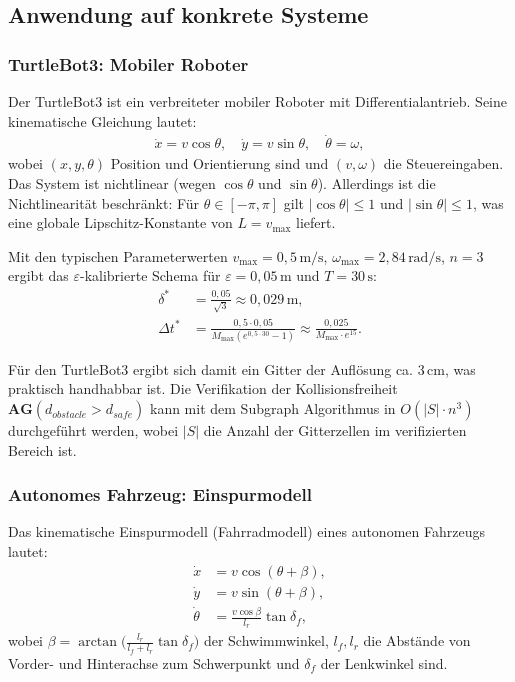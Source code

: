 ﻿\documentclass[a4paper,12pt]{article}
\theoremstyle{definition}
\begin{document}
\subsection{Anwendung auf konkrete Systeme}

\subsubsection{TurtleBot3: Mobiler Roboter}

Der TurtleBot3 ist ein verbreiteter mobiler Roboter mit Differentialantrieb. Seine kinematische Gleichung lautet:
\begin{align}
  \dot{x} = v\cos\theta, \quad \dot{y} = v\sin\theta, \quad \dot{\theta} = \omega,
\end{align}
wobei $(x, y, \theta)$ Position und Orientierung sind und $(v, \omega)$ die Steuereingaben. Das System ist nichtlinear (wegen $\cos\theta$ und $\sin\theta$). Allerdings ist die Nichtlinearität beschränkt: Für $\theta \in [-\pi, \pi]$ gilt $|\cos\theta| \leq 1$ und $|\sin\theta| \leq 1$, was eine globale Lipschitz-Konstante von $L = v_{\max}$ liefert.

Mit den typischen Parameterwerten $v_{\max} = 0{,}5\,\text{m/s}$, $\omega_{\max} = 2{,}84\,\text{rad/s}$, $n = 3$ ergibt das $\varepsilon$-kalibrierte Schema für $\varepsilon = 0{,}05\,\text{m}$ und $T = 30\,\text{s}$:
\begin{align}
  \delta^* &= \frac{0{,}05}{\sqrt{3}} \approx 0{,}029\,\text{m}, \\
  \Delta t^* &= \frac{0{,}5 \cdot 0{,}05}{M_{\max}(e^{0{,}5 \cdot 30}-1)} \approx \frac{0{,}025}{M_{\max} \cdot e^{15}}.
\end{align}

Für den TurtleBot3 ergibt sich damit ein Gitter der Auflösung ca. 3\,cm, was praktisch handhabbar ist. Die Verifikation der Kollisionsfreiheit $\mathbf{AG}(d_{\mathit{obstacle}} > d_{\mathit{safe}})$ kann mit dem Subgraph Algorithmus in $O(|S| \cdot n^3)$ durchgeführt werden, wobei $|S|$ die Anzahl der Gitterzellen im verifizierten Bereich ist.

\subsubsection{Autonomes Fahrzeug: Einspurmodell}

Das kinematische Einspurmodell (Fahrradmodell) eines autonomen Fahrzeugs lautet:
\begin{align}
  \dot{x} &= v\cos(\theta + \beta), \\
  \dot{y} &= v\sin(\theta + \beta), \\
  \dot{\theta} &= \frac{v\cos\beta}{l_r}\tan\delta_f,
\end{align}
wobei $\beta = \arctan\!\bigl(\frac{l_r}{l_f + l_r}\tan\delta_f\bigr)$ der Schwimmwinkel, $l_f, l_r$ die Abstände von Vorder- und Hinterachse zum Schwerpunkt und $\delta_f$ der Lenkwinkel sind.
\end{document}
